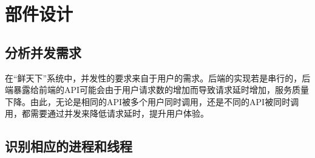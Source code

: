 \chapter{部件设计}

\section{分析并发需求}

在“鲜天下”系统中，并发性的要求来自于用户的需求。后端的实现若是串行的，后端暴露给前端的API可能会由于用户请求数的增加而导致请求延时增加，服务质量下降。由此，无论是相同的API被多个用户同时调用，还是不同的API被同时调用，都需要通过并发来降低请求延时，提升用户体验。

\section{识别相应的进程和线程}

